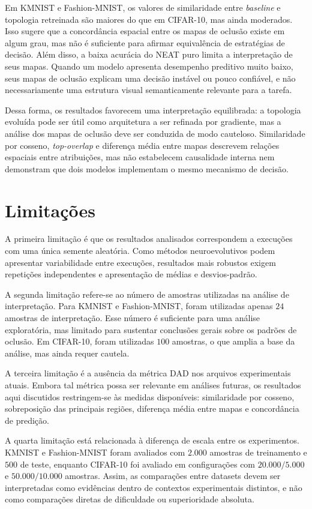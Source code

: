 Em KMNIST e Fashion-MNIST, os valores de similaridade entre \textit{baseline} e topologia retreinada são maiores do que em CIFAR-10, mas ainda moderados. Isso sugere que a concordância espacial entre os mapas de oclusão existe em algum grau, mas não é suficiente para afirmar equivalência de estratégias de decisão. Além disso, a baixa acurácia do NEAT puro limita a interpretação de seus mapas. Quando um modelo apresenta desempenho preditivo muito baixo, seus mapas de oclusão explicam uma decisão instável ou pouco confiável, e não necessariamente uma estrutura visual semanticamente relevante para a tarefa.

Dessa forma, os resultados favorecem uma interpretação equilibrada: a topologia evoluída pode ser útil como arquitetura a ser refinada por gradiente, mas a análise dos mapas de oclusão deve ser conduzida de modo cauteloso. Similaridade por cosseno, \textit{top-overlap} e diferença média entre mapas descrevem relações espaciais entre atribuições, mas não estabelecem causalidade interna nem demonstram que dois modelos implementam o mesmo mecanismo de decisão.

\section{Limitações}
\label{sec:limitacoes}

A primeira limitação é que os resultados analisados correspondem a execuções com uma única semente aleatória. Como métodos neuroevolutivos podem apresentar variabilidade entre execuções, resultados mais robustos exigem repetições independentes e apresentação de médias e desvios-padrão.

A segunda limitação refere-se ao número de amostras utilizadas na análise de interpretação. Para KMNIST e Fashion-MNIST, foram utilizadas apenas $24$ amostras de interpretação. Esse número é suficiente para uma análise exploratória, mas limitado para sustentar conclusões gerais sobre os padrões de oclusão. Em CIFAR-10, foram utilizadas $100$ amostras, o que amplia a base da análise, mas ainda requer cautela.

A terceira limitação é a ausência da métrica DAD nos arquivos experimentais atuais. Embora tal métrica possa ser relevante em análises futuras, os resultados aqui discutidos restringem-se às medidas disponíveis: similaridade por cosseno, sobreposição das principais regiões, diferença média entre mapas e concordância de predição.

A quarta limitação está relacionada à diferença de escala entre os experimentos. KMNIST e Fashion-MNIST foram avaliados com $2.000$ amostras de treinamento e $500$ de teste, enquanto CIFAR-10 foi avaliado em configurações com $20.000/5.000$ e $50.000/10.000$ amostras. Assim, as comparações entre datasets devem ser interpretadas como evidências dentro de contextos experimentais distintos, e não como comparações diretas de dificuldade ou superioridade absoluta.

